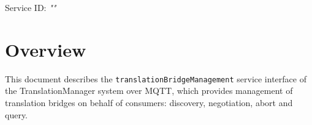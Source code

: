 \documentclass[a4paper]{arrowhead}
\begin{document}
\sloppy

\ArrowheadSetup

\begin{center}
  \vspace*{1cm}
  \huge{\arrowtitle}

  \vspace*{0.2cm}
  \LARGE{\arrowtype}
  \vspace*{1cm}

  \Large{Service ID: \textit{"\arrowid"}}

  \vspace*{\fill}


  \vspace*{1cm}
  \vspace*{\fill}

  \begin{abstract}
    This document describes the MQTT protocol with TLS payload security and JSON payload encoding variant of the \texttt{translation\allowbreak{}Bridge\allowbreak{}Management} service of the TranslationManager system.
  \end{abstract}

  \vspace*{1cm}
\end{center}

\newpage

\tableofcontents
\newpage

\section{Overview}
\label{sec:overview}

This document describes the \texttt{translation\allowbreak{}Bridge\allowbreak{}Management} service interface of the TranslationManager system over MQTT, which provides management of translation bridges on behalf of consumers: discovery, negotiation, abort and query.
\end{document}
